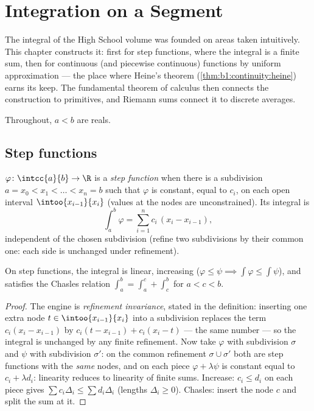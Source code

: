 \chapter{Integration on a Segment}\label{ch:b1:integration}

The integral of the High School volume was founded on areas taken
intuitively. This chapter constructs it: first for step functions,
where the integral is a finite sum, then for continuous (and
piecewise continuous) functions by uniform approximation --- the
place where Heine's theorem (\cref{thm:b1:continuity:heine}) earns
its keep. The fundamental theorem of calculus then connects the
construction to primitives, and Riemann sums connect it to discrete
averages.

Throughout, $a < b$ are reals.

\section{Step functions}

\begin{definition}\label{def:b1:integration:step}
$\varphi \colon \intcc{a}{b} \to \R$ is a \emph{step
function} when there is a subdivision $a = x_0
< x_1 < \dots < x_n = b$ such that $\varphi$ is constant, equal to
$c_i$, on each open interval $\intoo{x_{i-1}}{x_i}$ (values at the
nodes are unconstrained). Its integral is
\[
\int_a^b \varphi = \sum_{i=1}^{n} c_i\,(x_i - x_{i-1}),
\]
independent of the chosen subdivision (refine two subdivisions by
their common one: each side is unchanged under refinement).
\end{definition}

\begin{proposition}\label{prop:b1:integration:stepprops}
On step functions, the integral is linear, increasing ($\varphi \leq
\psi \implies \int\varphi \leq \int\psi$), and satisfies the Chasles
relation $\int_a^b = \int_a^c + \int_c^b$ for $a < c < b$.
\end{proposition}

\begin{proof}
The engine is \emph{refinement invariance}, stated in the
definition: inserting one extra node $t \in \intoo{x_{i-1}}{x_i}$
into a subdivision replaces the term $c_i(x_i - x_{i-1})$ by
$c_i(t - x_{i-1}) + c_i(x_i - t)$ --- the same number --- so the
integral is unchanged by any finite refinement. Now take
$\varphi$ with subdivision $\sigma$ and $\psi$ with subdivision
$\sigma'$: on the common refinement $\sigma \cup \sigma'$ both
are step functions with the \emph{same} nodes, and on each piece
$\varphi + \lambda\psi$ is constant equal to $c_i + \lambda
d_i$: linearity reduces to linearity of finite sums. Increase:
$c_i \leq d_i$ on each piece gives $\sum c_i \Delta_i \leq \sum
d_i \Delta_i$ (lengths $\Delta_i \geq 0$). Chasles: insert the
node $c$ and split the sum at it.
\end{proof}


